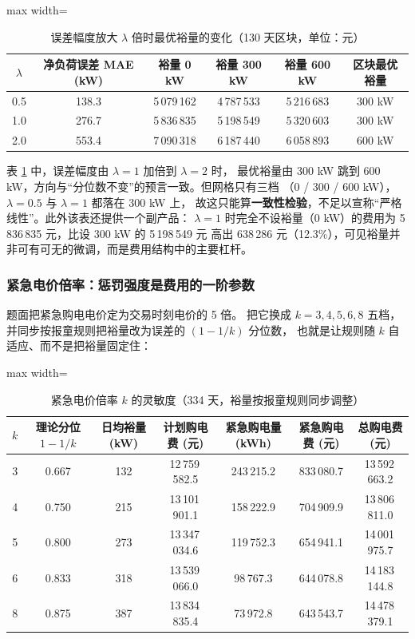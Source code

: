 \documentclass{cumcmthesis}
\begin{document}
\begin{table}[htbp]
\centering
\caption{误差幅度放大 $\lambda$ 倍时最优裕量的变化（130 天区块，单位：元）}
\label{tab:q2_sens_scale}
\begin{adjustbox}{max width=\textwidth}
\begin{tabular}{cccccc}
\hline
$\lambda$ & 净负荷误差 MAE (kW) & 裕量 0 kW & 裕量 300 kW & 裕量 600 kW & 区块最优裕量 \\
\hline
0.5 & 138.3 & 5\,079\,162 & 4\,787\,533 & 5\,216\,683 & 300 kW \\
1.0 & 276.7 & 5\,836\,835 & 5\,198\,549 & 5\,320\,603 & 300 kW \\
2.0 & 553.4 & 7\,090\,318 & 6\,187\,440 & 6\,058\,893 & 600 kW \\
\hline
\end{tabular}
\end{adjustbox}
\end{table}

\noindent 表 \ref{tab:q2_sens_scale} 中，误差幅度由 $\lambda=1$ 加倍到 $\lambda=2$ 时，
最优裕量由 300 kW 跳到 600 kW，方向与“分位数不变”的预言一致。但网格只有三档
（0 / 300 / 600 kW），$\lambda=0.5$ 与 $\lambda=1$ 都落在 300 kW 上，
故这只能算\textbf{一致性检验}，不足以宣称“严格线性”。此外该表还提供一个副产品：
$\lambda=1$ 时完全不设裕量（0 kW）的费用为 5\,836\,835 元，比设 300 kW 的 5\,198\,549 元
高出 638\,286 元（12.3\%），可见裕量并非可有可无的微调，而是费用结构中的主要杠杆。

\subsubsection{紧急电价倍率：惩罚强度是费用的一阶参数}
题面把紧急购电电价定为交易时刻电价的 5 倍。
把它换成 $k=3,4,5,6,8$ 五档，并同步按报童规则把裕量改为误差的 $(1-1/k)$ 分位数，
也就是让规则随 $k$ 自适应、而不是把裕量固定住：

\begin{table}[htbp]
\centering
\caption{紧急电价倍率 $k$ 的灵敏度（334 天，裕量按报童规则同步调整）}
\label{tab:q2_sens_k}
\begin{adjustbox}{max width=\textwidth}
\begin{tabular}{ccccccc}
\hline
$k$ & 理论分位 $1-1/k$ & 日均裕量 (kW) & 计划购电费 (元) & 紧急购电量 (kWh) & 紧急购电费 (元) & 总购电费 (元) \\
\hline
3 & 0.667 & 132 & 12\,759\,582.5 & 243\,215.2 & 833\,080.7 & 13\,592\,663.2 \\
4 & 0.750 & 215 & 13\,101\,901.1 & 158\,222.9 & 704\,909.9 & 13\,806\,811.0 \\
5 & 0.800 & 273 & 13\,347\,034.6 & 119\,752.3 & 654\,941.1 & 14\,001\,975.7 \\
6 & 0.833 & 318 & 13\,539\,066.0 & 98\,767.3 & 644\,078.8 & 14\,183\,144.8 \\
8 & 0.875 & 387 & 13\,834\,835.4 & 73\,972.8 & 643\,543.7 & 14\,478\,379.1 \\
\hline
\end{tabular}
\end{adjustbox}
\end{table}
\end{document}
